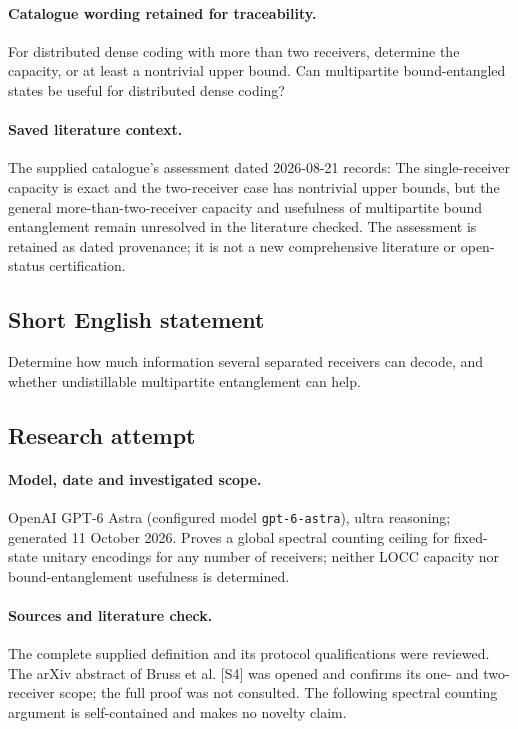 \documentclass[11pt]{article}
\begin{document}
\paragraph{Catalogue wording retained for traceability.}
For distributed dense coding with more than two receivers, determine the capacity, or at least a nontrivial upper bound. Can multipartite bound-entangled states be useful for distributed dense coding?

\paragraph{Saved literature context.} The supplied catalogue's assessment dated 2026-08-21 records: The single-receiver capacity is exact and the two-receiver case has nontrivial upper bounds, but the general more-than-two-receiver capacity and usefulness of multipartite bound entanglement remain unresolved in the literature checked. The assessment is retained as dated provenance; it is not a new comprehensive literature or open-status certification.
\subsection{Short English statement}
Determine how much information several separated receivers can decode, and whether undistillable multipartite entanglement can help.
\subsection{Research attempt}
\paragraph{Model, date and investigated scope.}
OpenAI GPT-6 Astra (configured model \texttt{gpt-6-astra}), ultra reasoning; generated 11 October 2026. Proves a global spectral counting ceiling for fixed-state unitary encodings for any number of receivers; neither LOCC capacity nor bound-entanglement usefulness is determined.

\paragraph{Sources and literature check.}
The complete supplied definition and its protocol qualifications were reviewed. The arXiv abstract of Bruss et al. [S4] was opened and confirms its one- and two-receiver scope; the full proof was not consulted. The following spectral counting argument is self-contained and makes no novelty claim.
\end{document}
